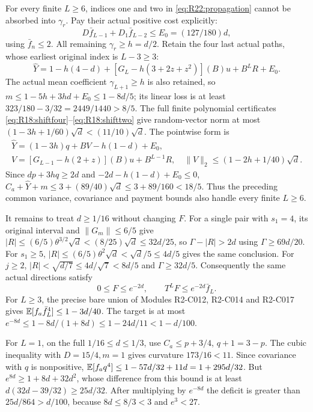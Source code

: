 For every finite $L\ge6$, indices one and two in
\eqref{eq:R22:propagation} cannot be absorbed into $\gamma_r$.
Pay their actual positive cost explicitly:
\[
D\bar f_{L-1}+D_1\bar f_{L-2}\le E_0=(127/180)d,
\]
using $\bar f_n\le2$. All remaining $\gamma_r\ge h=d/2$.
Retain the four last actual paths, whose earliest original index is
$L-3\ge3$:
\begin{equation}\tag{R22.7.2}\label{eq:R22:long}
\widehat Y=1-h(4-d)+[G_L-h(3+2z+z^2)](B)u+B^LR+E_0.
\end{equation}
The actual mean coefficient $\gamma_{L+1}\ge h$ is also retained, so
$m\le1-5h+3hd+E_0\le1-8d/5$; its linear loss is at least
$323/180-3/32=2449/1440>8/5$.
The full finite polynomial certificates
\eqref{eq:R18:shiftfour}--\eqref{eq:R18:shifttwo} give random-vector
norm at most $(1-3h+1/60)\sqrt d<(11/10)\sqrt d$.
The pointwise form is
\[
\begin{gathered}
\widehat Y=(1-3h)q+BV-h(1-d)+E_0,\\
V=[G_{L-1}-h(2+z)](B)u+B^{L-1}R,\quad
\|V\|_2\le(1-2h+1/40)\sqrt d.
\end{gathered}
\]
Since $dp+3hq\ge2d$ and $-2d-h(1-d)+E_0\le0$,
$C_a+\widehat Y+m\le3+(89/40)\sqrt d\le3+89/160<18/5$.
Thus the preceding common variance, covariance and payment bounds
also handle every finite $L\ge6$.

It remains to treat $d\ge1/16$ without changing $F$.
For a single pair with $s_1=4$, its original interval and
$\|G_m\|\le6/5$ give
$|R|\le(6/5)\theta^{3/2}\sqrt d<(8/25)\sqrt d\le32d/25$,
so $\Gamma-|R|>2d$ using $\Gamma\ge69d/20$.
For $s_1\ge5$, $|R|\le(6/5)\theta^2\sqrt d<\sqrt d/5\le4d/5$
gives the same conclusion. For $j\ge2$,
$|R|<\sqrt{d/7}\le4d/\sqrt7<8d/5$ and $\Gamma\ge32d/5$.
Consequently the same actual directions satisfy
\begin{equation}\tag{R22.8.1}\label{eq:R22:high}
0\le F\le e^{-2d},\qquad T^LF\le e^{-2d}\bar f_L.
\end{equation}
For $L\ge3$, the precise bare union of Modules R2-C012, R2-C014
and R2-C017 gives $\mathbb E[f_a\bar f_L^4]\le1-3d/40$.
The target is at most $e^{-8d}\le1-8d/(1+8d)
\le1-24d/11<1-d/100$.

For $L=1$, on the full $1/16\le d\le1/3$, use
$C_a\le p+3/4$, $q+1=3-p$.
The cubic inequality with $D=15/4,m=1$ gives curvature
$173/16<11$. Since covariance with $q$ is nonpositive,
$\mathbb E[f_aq^4]\le1-57d/32+11d=1+295d/32$.
But $e^{8d}\ge1+8d+32d^2$, whose difference from this bound is
at least $d(32d-39/32)\ge25d/32$.
After multiplying by $e^{-8d}$ the deficit is greater than
$25d/864>d/100$, because $8d\le8/3<3$ and $e^3<27$.

